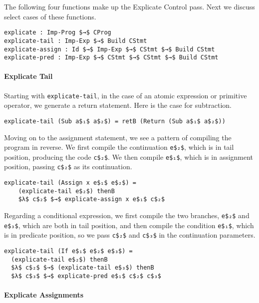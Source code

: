 \documentclass[sigplan,review,dvipsnames,screen,10pt]{acmart}
\begin{document}
\noindent The following four functions make up the Explicate Control
pass. Next we discuss select cases of these functions.

\begin{lstlisting}[basicstyle=\ttfamily\footnotesize]
explicate : Imp-Prog $→$ CProg
explicate-tail : Imp-Exp $→$ Build CStmt
explicate-assign : Id $→$ Imp-Exp $→$ CStmt $→$ Build CStmt
explicate-pred : Imp-Exp $→$ CStmt $→$ CStmt $→$ Build CStmt
\end{lstlisting}

\paragraph{Explicate Tail}

Starting with \lstinline{explicate-tail}, in the case of an atomic
expression or primitive operator, we generate a return statement.
Here is the case for subtraction.

\begin{lstlisting}
explicate-tail (Sub a$₁$ a$₂$) = retB (Return (Sub a$₁$ a$₂$))
\end{lstlisting}

\noindent Moving on to the assignment statement, we see a pattern of
compiling the program in reverse. We first compile the continuation
\lstinline{e$₂$}, which is in tail position, producing the code \lstinline{c$₂$}.
We then compile \lstinline{e$₁$}, which is in assignment position,
passing \lstinline{c$₂$} as its continuation.

\begin{lstlisting}
explicate-tail (Assign x e$₁$ e$₂$) =
    (explicate-tail e$₂$) thenB
    $λ$ c$₂$ $→$ explicate-assign x e$₁$ c$₂$
\end{lstlisting}

\noindent Regarding a conditional expression, we first compile the two
branches, \lstinline{e$₂$} and \lstinline{e$₃$}, which are both in tail
position, and then compile the condition \lstinline{e$₁$}, which is in
predicate position, so we pass \lstinline{c$₂$} and \lstinline{c$₃$} in
the continuation parameters.

\begin{lstlisting}
explicate-tail (If e$₁$ e$₂$ e$₃$) =
  (explicate-tail e$₂$) thenB
  $λ$ c$₂$ $→$ (explicate-tail e$₃$) thenB
  $λ$ c$₃$ $→$ explicate-pred e$₁$ c$₂$ c$₃$
\end{lstlisting}

\paragraph{Explicate Assignments}
\end{document}
